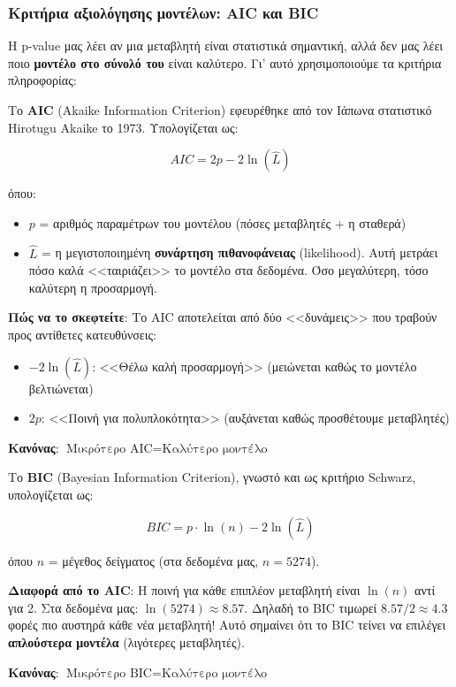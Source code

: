 \documentclass[12pt,a4paper]{article}
\begin{document}
\subsubsection{Κριτήρια αξιολόγησης μοντέλων: AIC και BIC}

Η p-value μας λέει αν μια μεταβλητή είναι στατιστικά σημαντική, αλλά δεν μας λέει ποιο \textbf{μοντέλο στο σύνολό του} είναι καλύτερο. Γι' αυτό χρησιμοποιούμε τα κριτήρια πληροφορίας:

\begin{theorybox}
Το \textbf{AIC} (Akaike Information Criterion) εφευρέθηκε από τον Ιάπωνα στατιστικό Hirotugu Akaike το 1973. Υπολογίζεται ως:

\begin{equation}
AIC = 2p - 2\ln(\hat{L})
\end{equation}

όπου:
\begin{itemize}
    \item $p$ = αριθμός παραμέτρων του μοντέλου (πόσες μεταβλητές + η σταθερά)
    \item $\hat{L}$ = η μεγιστοποιημένη \textbf{συνάρτηση πιθανοφάνειας} (likelihood). Αυτή μετράει πόσο καλά <<ταιριάζει>> το μοντέλο στα δεδομένα. Όσο μεγαλύτερη, τόσο καλύτερη η προσαρμογή.
\end{itemize}

\textbf{Πώς να το σκεφτείτε}: Το AIC αποτελείται από δύο <<δυνάμεις>> που τραβούν προς αντίθετες κατευθύνσεις:
\begin{itemize}
    \item $-2\ln(\hat{L})$: <<Θέλω καλή προσαρμογή>> (μειώνεται καθώς το μοντέλο βελτιώνεται)
    \item $2p$: <<Ποινή για πολυπλοκότητα>> (αυξάνεται καθώς προσθέτουμε μεταβλητές)
\end{itemize}

\textbf{Κανόνας}: $\text{Μικρότερο AIC} = \text{Καλύτερο μοντέλο}$
\end{theorybox}

\begin{theorybox}
Το \textbf{BIC} (Bayesian Information Criterion), γνωστό και ως κριτήριο Schwarz, υπολογίζεται ως:

\begin{equation}
BIC = p \cdot \ln(n) - 2\ln(\hat{L})
\end{equation}

όπου $n$ = μέγεθος δείγματος (στα δεδομένα μας, $n = 5274$).

\textbf{Διαφορά από το AIC}: Η ποινή για κάθε επιπλέον μεταβλητή είναι $\ln(n)$ αντί για 2. Στα δεδομένα μας: $\ln(5274) \approx 8.57$. Δηλαδή το BIC τιμωρεί $8.57 / 2 \approx 4.3$ φορές πιο αυστηρά κάθε νέα μεταβλητή! Αυτό σημαίνει ότι το BIC τείνει να επιλέγει \textbf{απλούστερα μοντέλα} (λιγότερες μεταβλητές).

\textbf{Κανόνας}: $\text{Μικρότερο BIC} = \text{Καλύτερο μοντέλο}$
\end{theorybox}
\end{document}

